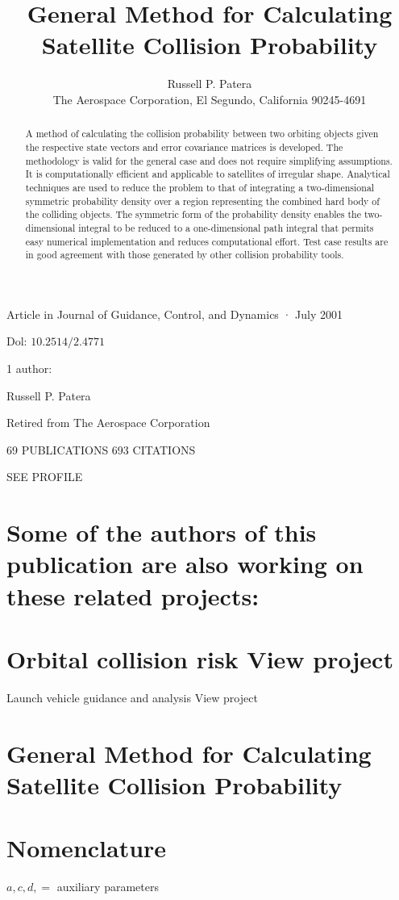 \documentclass[10pt]{article}
\title{General Method for Calculating Satellite Collision Probability }
\author{Russell P. Patera\\
The Aerospace Corporation, El Segundo, California 90245-4691}
\date{}
\begin{document}
\maketitle
Article in Journal of Guidance, Control, and Dynamics · July 2001

Dol: $10.2514 / 2.4771$

1 author:

Russell P. Patera

Retired from The Aerospace Corporation

69 PUBLICATIONS 693 CITATIONS

SEE PROFILE

\section{Some of the authors of this publication are also working on these related projects:}
\section{Orbital collision risk View project}
Launch vehicle guidance and analysis View project

\section*{General Method for Calculating Satellite Collision Probability }


\begin{abstract}
A method of calculating the collision probability between two orbiting objects given the respective state vectors and error covariance matrices is developed. The methodology is valid for the general case and does not require simplifying assumptions. It is computationally efficient and applicable to satellites of irregular shape. Analytical techniques are used to reduce the problem to that of integrating a two-dimensional symmetric probability density over a region representing the combined hard body of the colliding objects. The symmetric form of the probability density enables the two-dimensional integral to be reduced to a one-dimensional path integral that permits easy numerical implementation and reduces computational effort. Test case results are in good agreement with those generated by other collision probability tools.
\end{abstract}

\section{Nomenclature}
$a, c, d,=$ auxiliary parameters
\end{document}
